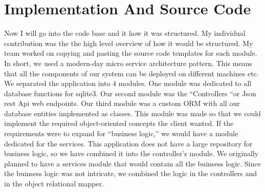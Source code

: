 \documentclass{article}
\begin{document}
\section{Implementation And Source Code }
 Now I will go into the code base and it how it was structured. My individual contribution was the the high level overview of how it would be structured. My team worked on copying and pasting the source code templates for each module. In short, we used a modern-day micro service architecture pattern. This means that all the components of our system can be deployed on different machines etc. We separated the application into 4 modules. One module was dedicated to all database functions for sqlite3. Our second module was the “Controllers “or Json rest Api web endpoints. Our third module was a custom ORM with all our database entities implemented as classes. This module was made so that we could implement the required object-oriented concepts the client wanted. If the requirements were to expand for “business logic,” we would have a module dedicated for the services. This application does not have a large repository for business logic, so we have combined it into the controller's module. We originally planned to have a services module that would contain all the buinsess logic. Since the buinsess logic was not intricate, we combined the logic in the controllers and in the object relational mapper. 
\end{document}

